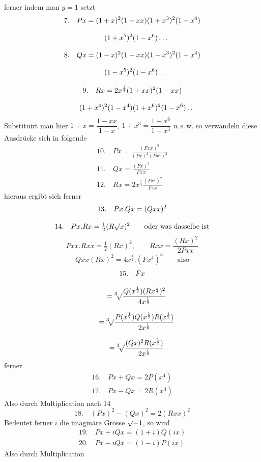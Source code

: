 
ferner indem man $y=1$ setzt
\[
\begin{gathered}
7.\quad Px=(1+x)^2(1-xx)(1+x^3)^2(1-x^4)\\[8pt]\quad{}(1+x^5)^2(1-x^6)\mathinner{.\,.\,.}\\[8pt]
8.\quad Qx=(1-x)^2(1-xx)(1-x^3)^2(1-x^4)\\[8pt]\quad{}(1-x^5)^2(1-x^6)\mathinner{.\,.\,.}\\[8pt]
9.\quad Rx=2x^{\frac14}(1+xx)^2(1-xx)\\[8pt]\quad{}(1+x^4)^2(1-x^4)(1+x^6)^2(1-x^6)\mathinner{.\,.}
\end{gathered}
\]
Substituirt man hier $1+x=\dfrac{1-xx}{1-x}$, $1+x^3=\dfrac{1-x^6}{1-x^3}$ u.\,s.\,w. so verwandeln diese Ausdrücke sich in folgende
\[
\begin{gathered}
10.\quad Px=\frac{(Fxx)^5}{(Fx)^2(Fx^4)^2}\\[8pt]
11.\quad Qx=\frac{(Fx)^2}{Fxx}\\[8pt]
12.\quad Rx=2x^{\frac14}\frac{(Fx^4)^2}{Fxx}
\end{gathered}
\]
hieraus ergibt sich ferner
\[
\begin{gathered}
13.\quad Px.Qx=(Qxx)^2\\[8pt]
14.\quad Px.Rx=\tfrac12(R\mathord{\surd}{x})^2\qquad\text{oder was dasselbe ist}
\end{gathered}
\]
\[
Pxx.Rxx=\tfrac12(Rx)^2,\qquad Rxx=\frac{(Rx)^2}{2Pxx}
\]
\[
Qxx(Rx)^2=4x^{\frac12}.(Fx^4)^3\qquad\text{also}
\]
\[
\begin{gathered}15.\quad Fx\\[8pt]\quad{}=\mathord{{}^{3}\!\surd}{\frac{Q(x^{\frac12})(Rx^{\frac14})^2}{4x^{\frac18}}}
\\[8pt]\quad{}=\mathord{{}^{3}\!\surd}{\frac{P(x^{\frac12})Q(x^{\frac12})R(x^{\frac12})}{2x^{\frac18}}}
\\[8pt]\quad{}=\mathord{{}^{3}\!\surd}{\frac{(Qx)^2R(x^{\frac12})}{2x^{\frac18}}}\end{gathered}
\]
ferner
\[
\begin{gathered}
16.\quad Px+Qx=2P(x^4)\\[8pt]
17.\quad Px-Qx=2R(x^4)
\end{gathered}
\]
Also durch Multiplication nach 14
\[
18.\quad (Px)^2-(Qx)^2=2(Rxx)^2
\]
Bedeutet ferner $i$ die imaginäre Grösse $\mathord{\surd}{-1}$, so wird
\[
\begin{gathered}
19.\quad Px+iQx=(1+i)Q(ix)\\[8pt]
20.\quad Px-iQx=(1-i)P(ix)
\end{gathered}
\]
Also durch Multiplication

